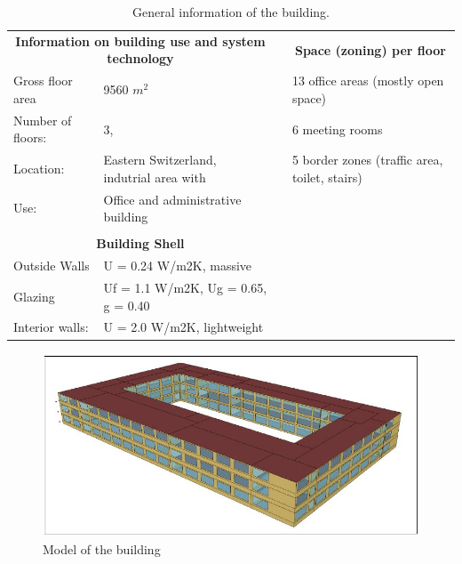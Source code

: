 \begin{table}[htbp]
  \centering
  \tiny
  \caption{General information of the building.}
    \begin{tabular}{|l|l|rrr}
\cline{1-2}\cline{4-5}    \multicolumn{2}{|c|}{\textbf{Information on building use and system technology}} & \multicolumn{1}{r|}{} & \multicolumn{2}{c|}{\textbf{Space (zoning) per floor}} \bigstrut\\
\cline{1-2}\cline{4-5}    Gross floor area & 9560 $m^2$ & \multicolumn{1}{r|}{} & \multicolumn{2}{l|}{13 office areas (mostly open space)} \bigstrut\\
\cline{1-2}\cline{4-5}    Number of floors: & 3,    & \multicolumn{1}{r|}{} & \multicolumn{2}{l|}{6 meeting rooms} \bigstrut\\
\cline{1-2}\cline{4-5}    Location: & Eastern Switzerland, indutrial area with& \multicolumn{1}{r|}{} & \multicolumn{2}{l|}{5 border zones (traffic area, toilet, stairs)} \bigstrut\\
\cline{1-2}\cline{4-5}    Use:  & Office and administrative building &      &      &  \bigstrut\\
\cline{1-2}    \multicolumn{1}{r}{} & \multicolumn{1}{r}{} &      &      &  \bigstrut\\
\cline{1-2}    \multicolumn{2}{|c|}{\textbf{Building Shell}} &      &      &  \bigstrut\\
\cline{1-2}    Outside Walls & U = 0.24 W/m2K, massive &      &      &  \bigstrut\\
\cline{1-2}    Glazing & Uf = 1.1 W/m2K, Ug = 0.65, g = 0.40 &      &      &  \bigstrut\\
\cline{1-2}    Interior walls: & U = 2.0 W/m2K, lightweight &      &      &  \bigstrut\\
\cline{1-2}    \end{tabular}%
  \label{tab:general_information}%
\end{table}%

\begin{figure}[h!]
  \vspace{0.5em} %
  \includegraphics[scale=0.4]{Figures/building_model.jpg}
  \caption{Model of the building \cite{roman2015}}  
  \label{fig:building_model}
\end{figure}

